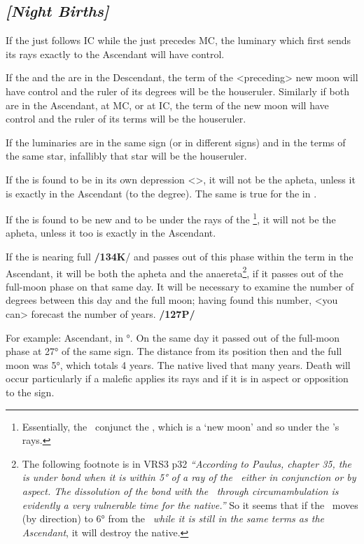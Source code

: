 \subsection{\textit{[Night Births]}}

If the \Sun\xspace just follows IC while the \Moon\xspace just
precedes MC, the luminary which first sends its rays exactly to the Ascendant will have control. 

If the \Sun\xspace and the \Moon\xspace are in the Descendant, the term of the <preceding> new moon will have control and the ruler of its degrees will be the houseruler. Similarly if both are in the Ascendant, at MC, or at IC, the term of the new moon will have control and the ruler of its terms will be the houseruler. 

If the luminaries are in the same sign (or in different signs) and in the terms of the same star, infallibly that star will be the houseruler.

If the \Sun\xspace is found to be in its own depression <\Libra>, it will not be the apheta, unless it is exactly in
the Ascendant (to the degree). The same is true for the \Moon\xspace in \Scorpio\xspace <its depression>. 

If the \Moon\xspace is found to be new and to be under the rays of the \Sun\footnote{Essentially, the \Moon\, conjunct the \Sun, which is a `new moon' and so under the \Sun's rays.}, it will not be the apheta, unless it too is exactly in the Ascendant.

If the \Moon\xspace is nearing full \textbf{/134K}/ and passes out of this phase within the term in the Ascendant, it will be both the apheta and the anaereta\footnote{The following footnote is in VRS3 p32 \textsl{``According to Paulus, chapter 35, the \Moon\, is under bond when it is within 5° of a ray of the \Sun\, either in conjunction or by aspect. The dissolution of the bond with the \Sun\, through circumambulation is evidently a very vulnerable time for the native.''} So it seems that if the \Moon\, moves (by direction) to 6° from the \Sun\, \textsl{while it is still in the same terms as the Ascendant}, it will destroy the native.}, if it passes out of the full-moon phase on that same day. It will be necessary to examine the number of degrees between this day and the full moon; having found this number, <you can> forecast the number of years. \textbf{/127P/}

For example: Ascendant, \Moon\xspace in °. On the same day it passed out of the full-moon phase at 27° of the same sign. The distance from its position then and the full moon was 5°, which totals 4 years. The native lived that many years. Death will occur particularly if a malefic applies its rays and if it is in aspect or opposition to the sign.

